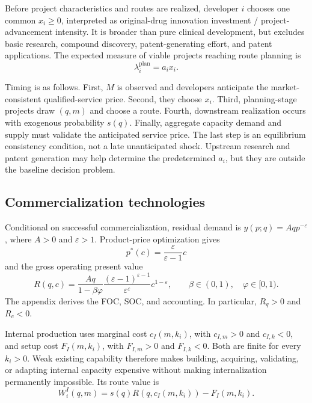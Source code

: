 \documentclass[11pt]{article}
\begin{document}
Before project characteristics and routes are realized, developer \(i\)
chooses one common \(x_i\geq0\), interpreted as original-drug innovation
investment / project-advancement intensity. It is broader than pure clinical
development, but excludes basic research, compound discovery,
patent-generating effort, and patent applications. The expected measure of
viable projects reaching route planning is
\begin{equation}
  \lambda_i^{\mathrm{plan}}=a_ix_i.
  \label{eq:p16m-planning}
\end{equation}

Timing is as follows. First, \(M\) is observed and developers anticipate the
market-consistent qualified-service price. Second, they choose \(x_i\).
Third, planning-stage projects draw \((q,m)\) and choose a route. Fourth,
downstream realization occurs with exogenous probability \(s(q)\). Finally,
aggregate capacity demand and supply must validate the anticipated service
price. The last step is an equilibrium consistency condition, not a late
unanticipated shock. Upstream research and patent generation may help
determine the predetermined \(a_i\), but they are outside the baseline
decision problem.

\subsection{Commercialization technologies}
\label{subsec:p16m-technologies}

Conditional on successful commercialization, residual demand is
\(y(p;q)=Aqp^{-\varepsilon}\), where \(A>0\) and \(\varepsilon>1\).
Product-price optimization gives
\[
  p^*(c)=\frac{\varepsilon}{\varepsilon-1}c
\]
and the gross operating present value
\begin{equation}
  R(q,c)
  =
  \frac{Aq}{1-\beta\varphi}
  \frac{(\varepsilon-1)^{\varepsilon-1}}
       {\varepsilon^\varepsilon}
  c^{1-\varepsilon},
  \qquad
  \beta\in(0,1),\quad \varphi\in[0,1).
  \label{eq:p16m-return}
\end{equation}
The appendix derives the FOC, SOC, and accounting. In particular,
\(R_q>0\) and \(R_c<0\).

Internal production uses marginal cost \(c_I(m,k_i)\), with
\(c_{I,m}>0\) and \(c_{I,k}<0\), and setup cost \(F_I(m,k_i)\), with
\(F_{I,m}>0\) and \(F_{I,k}<0\). Both are finite for every \(k_i>0\).
Weak existing capability therefore makes building, acquiring, validating, or
adapting internal capacity expensive without making internalization
permanently impossible. Its route value is
\begin{equation}
  W_i^I(q,m)
  =
  s(q)R\!\left(q,c_I(m,k_i)\right)-F_I(m,k_i).
  \label{eq:p16m-internal}
\end{equation}
\end{document}
